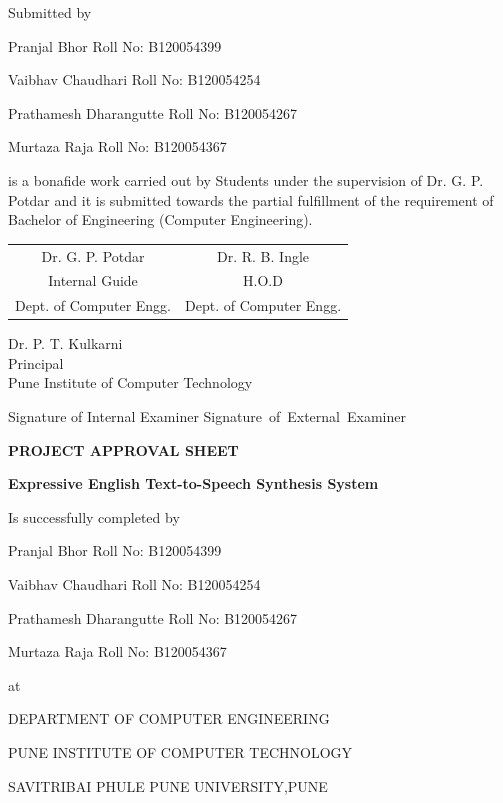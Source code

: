 \documentclass[oneside,a4paper,12pt]{book}
\begin{document}
\centerline{Submitted by}
\vspace*{0.5\baselineskip} 
\centerline{Pranjal Bhor  \hspace{25 mm} Roll No: B120054399 } 
\centerline{Vaibhav Chaudhari \hspace{14 mm} Roll No: B120054254 } 
\centerline{Prathamesh Dharangutte \hspace{3 mm} Roll No: B120054267 }
\centerline{Murtaza Raja \hspace{24 mm} Roll No: B120054367 }\hfill \break
\hfill \break
is a bonafide work carried out by Students under the supervision of Dr. G. P. Potdar and it
is submitted towards the partial fulfillment of the requirement of Bachelor of Engineering (Computer Engineering).\\
\vskip 1cm
\bgroup
\def\arraystretch{0.7}
\begin{tabular}{c c }
Dr.  G. P. Potdar &  \hspace{50 mm} Dr. R. B. Ingle \\								
Internal Guide   &  \hspace{50 mm} H.O.D \\
Dept. of Computer Engg.  &	\hspace{50 mm}Dept. of Computer Engg.  \\
\end{tabular}
\begin{center}
{
\vskip 1cm
Dr. P. T. Kulkarni\\
Principal\\
Pune Institute of Computer Technology  
}
\end{center}
\vskip 1cm
Signature of Internal Examiner \hspace{40 mm}\mbox{Signature of External Examiner}
\newpage
\begin{center}
\textbf{PROJECT APPROVAL SHEET}
\end{center}
\hfill \break
\begin{center}
 \textbf{Expressive English Text-to-Speech Synthesis System}
 \end{center}
\begin{center}
Is successfully completed by 
\end{center}
\centerline{Pranjal Bhor  \hspace{25 mm} Roll No: B120054399 } 
\centerline{Vaibhav Chaudhari \hspace{14 mm} Roll No: B120054254  } 
\centerline{Prathamesh Dharangutte \hspace{3 mm} Roll No: B120054267 }
\centerline{Murtaza Raja \hspace{24 mm} Roll No: B120054367 }
\begin{center}
 at
 \end{center} 
 \begin{center}
 DEPARTMENT OF COMPUTER ENGINEERING
 \end{center}
 \begin{center}
 PUNE INSTITUTE OF COMPUTER TECHNOLOGY
 \end{center}
 \begin{center}
 SAVITRIBAI PHULE PUNE UNIVERSITY,PUNE
 \end{center}
 
\end{document}
